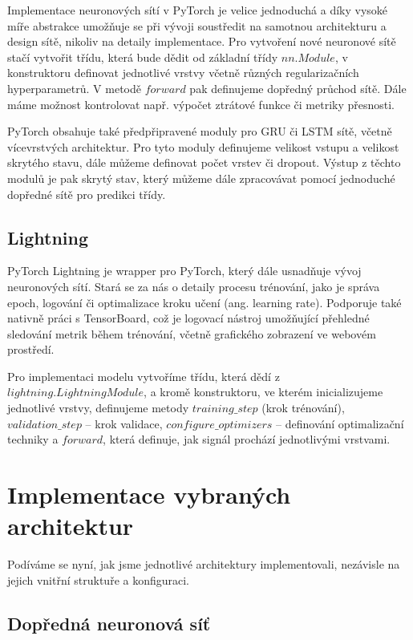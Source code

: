 Implementace neuronových sítí v PyTorch je velice jednoduchá a díky vysoké míře
abstrakce umožňuje se při vývoji soustředit na samotnou architekturu a design
sítě, nikoliv na detaily implementace. Pro vytvoření nové neuronové sítě stačí
vytvořit třídu, která bude dědit od základní třídy $nn.Module$, v konstruktoru
definovat jednotlivé vrstvy včetně různých regularizačních hyperparametrů. V
metodě $forward$ pak definujeme dopředný průchod sítě. Dále máme možnost
kontrolovat např. výpočet ztrátové funkce či metriky přesnosti.

PyTorch obsahuje také předpřipravené moduly pro GRU či LSTM sítě, včetně
vícevrstvých architektur. Pro tyto moduly definujeme velikost vstupu a velikost
skrytého stavu, dále můžeme definovat počet vrstev či dropout. Výstup z těchto
modulů je pak skrytý stav, který můžeme dále zpracovávat pomocí jednoduché
dopředné sítě pro predikci třídy.

\subsection{Lightning}
\label{sec:Lightning}

PyTorch Lightning je wrapper pro PyTorch, který dále usnadňuje vývoj
neuronových sítí. Stará se za nás o detaily procesu trénování, jako je správa
epoch, logování či optimalizace kroku učení (ang. learning rate). Podporuje
také nativně práci s TensorBoard, což je logovací nástroj umožňující přehledné
sledování metrik během trénování, včetně grafického zobrazení ve webovém
prostředí.

Pro implementaci modelu vytvoříme třídu, která dědí z
$lightning.LightningModule$, a kromě konstruktoru, ve kterém inicializujeme
jednotlivé vrstvy, definujeme metody $training\_step$ (krok trénování),
$validation\_step$ – krok validace, $configure\_optimizers$ – definování
optimalizační techniky a $forward$, která definuje, jak signál prochází
jednotlivými vrstvami.

\section{Implementace vybraných architektur}
\label{sec:SelectedArchitectures}

Podíváme se nyní, jak jsme jednotlivé architektury implementovali, nezávisle na
jejich vnitřní struktuře a konfiguraci.

\subsection{Dopředná neuronová síť}

